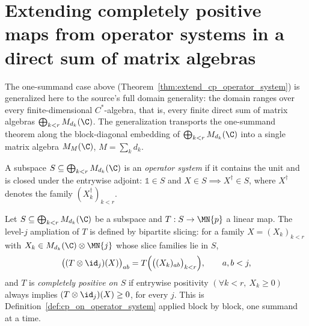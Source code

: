 \section{Extending completely positive maps from operator systems in a direct
sum of matrix algebras}

The one-summand case above (Theorem~\ref{thm:extend_cp_operator_system}) is
generalized here to the source's full domain generality: the domain
ranges over every finite-dimensional $C^*$-algebra, that is, every finite
direct sum of matrix algebras $\bigoplus_{k<r}M_{d_k}(\C)$. The
generalization transports the one-summand theorem along the block-diagonal
embedding of $\bigoplus_{k<r}M_{d_k}(\C)$ into a single matrix algebra
$M_M(\C)$, $M=\sum_kd_k$.

\begin{definition}
    \label{def:operator_system_direct_sum}
    \leanok
    A subspace $S\subseteq\bigoplus_{k<r}M_{d_k}(\C)$ is an \emph{operator
    system} if it contains the unit and is closed under the entrywise
    adjoint: $\mathbb1\in S$ and $X\in S\implies X^\dagger\in S$, where
    $X^\dagger$ denotes the family $(X_k^\dagger)_{k<r}$.
\end{definition}

\begin{definition}
    \label{def:cp_on_operator_system_direct_sum}
    \leanok
    Let $S\subseteq\bigoplus_{k<r}M_{d_k}(\C)$ be a subspace and
    $T:S\to\MN{p}$ a linear map. The level-$j$ ampliation of $T$ is defined
    by bipartite slicing: for a family $X=(X_k)_{k<r}$ with
    $X_k\in M_{d_k}(\C)\otimes\MN{j}$ whose slice families lie in $S$,
    \begin{align}
        \bigl((T\otimes\id_j)(X)\bigr)_{ab}
        =T\Bigl(\bigl((X_k)_{ab}\bigr)_{k<r}\Bigr),
        \qquad a,b<j,
    \end{align}
    and $T$ is \emph{completely positive on $S$} if entrywise positivity
    $(\forall k<r,\ X_k\ge0)$ always implies $(T\otimes\id_j)(X)\ge0$, for
    every $j$. This is Definition~\ref{def:cp_on_operator_system} applied
    block by block, one summand at a time.
\end{definition}

